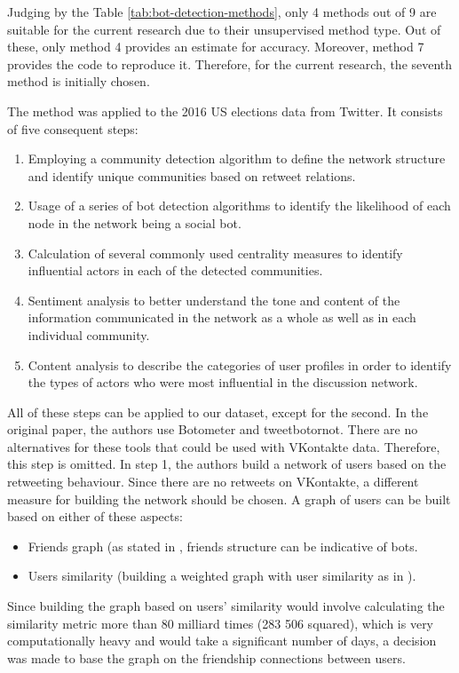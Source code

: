 Judging by the Table \ref{tab:bot-detection-methods}, only 4 methods out of 9 are suitable for the current research due to their unsupervised method type. Out of these, only method 4 provides an estimate for accuracy. Moreover, method 7 provides the code to reproduce it. Therefore, for the current research, the seventh method is initially chosen.

The method was applied to the 2016 US elections data from Twitter. It consists of five consequent steps:

\begin{enumerate}
    \item Employing a community detection algorithm to define the network structure and identify unique communities based on retweet relations.
    \item Usage of a series of bot detection algorithms to identify the likelihood of each node in the network being a social bot.
    \item Calculation of several commonly used centrality measures to identify influential actors in each of the detected communities.
    \item Sentiment analysis to better understand the tone and content of the information communicated in the network as a whole as well as in each individual community.
    \item Content analysis to describe the categories of user profiles in order to identify the types of actors who were most influential in the discussion network.
\end{enumerate}

All of these steps can be applied to our dataset, except for the second. In the
original paper, the authors use Botometer and tweetbotornot. There are no alternatives for these tools that could be used with VKontakte data. Therefore, this step is omitted.
In step 1, the authors build a network of users based on the retweeting behaviour. Since there are no retweets on VKontakte, a different measure for building the network should be chosen. A graph of users can be built based on either of these aspects:
\begin{itemize}
    \item Friends graph (as stated in \cite{Kolomeets2021}, friends structure can be indicative of bots.
    \item Users similarity (building a weighted graph with user similarity as in \cite{Fazil2020}).
\end{itemize}

Since building the graph based on users' similarity would involve calculating the similarity metric more than 80 milliard times (283 506 squared), which is very computationally heavy and would take a significant number of days, a decision was made to base the graph on the friendship connections between users.

